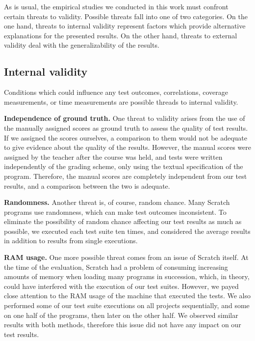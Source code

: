 As is usual, the empirical studies we conducted in this work must confront certain threats to validity.
Possible threats fall into one of two categories.
On the one hand, threats to internal validity represent factors which provide alternative explanations for the presented results.
On the other hand, threats to external validity deal with the generalizability of the results.

\subsection{Internal validity}

Conditions which could influence any test outcomes, correlations, coverage measurements,
or time measurements are possible threads to internal validity.
\parspace

\textbf{Independence of ground truth.}
One threat to validity arises from the use of the manually assigned scores as
ground truth to assess the quality of test results.
If we assigned the scores ourselves,
a comparison to them would not be adequate to give evidence about the quality of the results.
However, the manual scores were assigned by the teacher after the course was held,
and tests were written independently of the grading scheme, only using the textual specification of the program.
Therefore, the manual scores are completely independent from our test results,
and a comparison between the two is adequate.
\parspace

\textbf{Randomness.}
Another threat is, of course, random chance.
Many Scratch programs use randomness, which can make test outcomes inconsistent.
To eliminate the possibility of random chance affecting our test results as much as possible, we executed each test suite ten times,
and considered the average results in addition to results from single executions.
\parspace

\textbf{RAM usage.}
One more possible threat comes from an issue of Scratch itself.
At the time of the evaluation, Scratch had a problem of consuming increasing amounts of memory when loading many programs in succession,
which, in theory, could have interfered with the execution of our test suites.
However, we payed close attention to the RAM usage of the machine that executed the tests.
We also performed some of our test suite executions on all projects sequentially,
and some on one half of the programs, then later on the other half.
We observed similar results with both methods, therefore this issue did not have any impact on our test results.
\parspace

